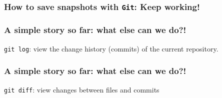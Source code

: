 \documentclass{beamer}
\begin{document}
\begin{frame}
\frametitle{How to save snapshots with \texttt{Git}: Keep working!}
\begin{center}
\end{center}
\end{frame}


\begin{frame}
\frametitle{A simple story so far: what else can we do?!}
\texttt{git log}: view the change history (commits) of the current repository.

\end{frame}

\begin{frame}
\frametitle{A simple story so far: what else can we do?!}
\texttt{git diff}: view changes between files and commits
\begin{center}
\end{center}
\end{frame}
\end{document}
